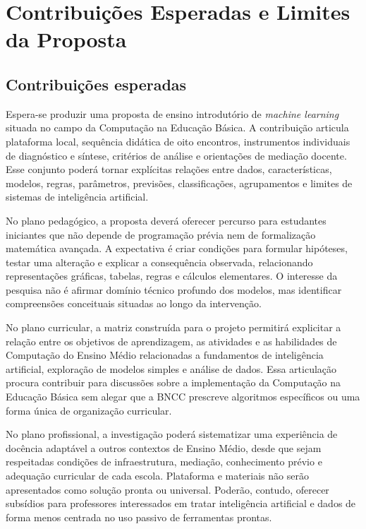 \chapter{Contribuições Esperadas e Limites da Proposta}

\section{Contribuições esperadas}

Espera-se produzir uma proposta de ensino introdutório de \textit{machine learning} situada no campo da Computação na Educação Básica. A contribuição articula plataforma local, sequência didática de oito encontros, instrumentos individuais de diagnóstico e síntese, critérios de análise e orientações de mediação docente. Esse conjunto poderá tornar explícitas relações entre dados, características, modelos, regras, parâmetros, previsões, classificações, agrupamentos e limites de sistemas de inteligência artificial.

No plano pedagógico, a proposta deverá oferecer percurso para estudantes iniciantes que não depende de programação prévia nem de formalização matemática avançada. A expectativa é criar condições para formular hipóteses, testar uma alteração e explicar a consequência observada, relacionando representações gráficas, tabelas, regras e cálculos elementares. O interesse da pesquisa não é afirmar domínio técnico profundo dos modelos, mas identificar compreensões conceituais situadas ao longo da intervenção.

No plano curricular, a matriz construída para o projeto permitirá explicitar a relação entre os objetivos de aprendizagem, as atividades e as habilidades de Computação do Ensino Médio relacionadas a fundamentos de inteligência artificial, exploração de modelos simples e análise de dados. Essa articulação procura contribuir para discussões sobre a implementação da Computação na Educação Básica sem alegar que a BNCC prescreve algoritmos específicos ou uma forma única de organização curricular.

No plano profissional, a investigação poderá sistematizar uma experiência de docência adaptável a outros contextos de Ensino Médio, desde que sejam respeitadas condições de infraestrutura, mediação, conhecimento prévio e adequação curricular de cada escola. Plataforma e materiais não serão apresentados como solução pronta ou universal. Poderão, contudo, oferecer subsídios para professores interessados em tratar inteligência artificial e dados de forma menos centrada no uso passivo de ferramentas prontas.

